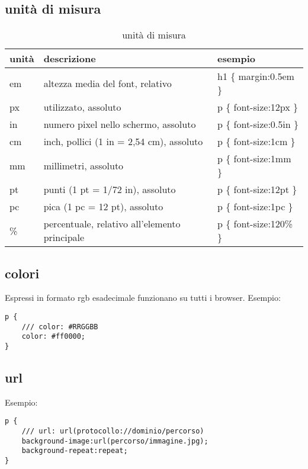 \documentclass[12pt]{article}
\begin{document}
\subsection{unità di misura}
\begin{table}[H]
	\centering
	\begin{tabular}{|l|l|l|}
		\hline
		unità & descrizione                                   & esempio                 \\
		\hline
		em    & altezza media del font, relativo              & h1 \{ margin:0.5em \}   \\
		px    & utilizzato, assoluto                          & p \{ font-size:12px \}  \\
		in    & numero pixel nello schermo, assoluto          & p \{ font-size:0.5in \} \\
		cm    & inch, pollici (1 in = 2,54 cm), assoluto      & p \{ font-size:1cm \}   \\
		mm    & millimetri, assoluto                          & p \{ font-size:1mm \}   \\
		pt    & punti (1 pt = 1/72 in), assoluto              & p \{ font-size:12pt \}  \\
		pc    & pica (1 pc = 12 pt), assoluto                 & p \{ font-size:1pc \}   \\
		\%    & percentuale, relativo all'elemento principale & p \{ font-size:120\% \} \\
		\hline
	\end{tabular}
	\caption{unità di misura}
\end{table}

\subsection{colori}
Espressi in formato rgb esadecimale funzionano su tutti i browser.
Esempio:
\begin{lstlisting}
p {
	/// color: #RRGGBB
	color: #ff0000;
}
\end{lstlisting}

\subsection{url}
Esempio:
\begin{lstlisting}
p {
	/// url: url(protocollo://dominio/percorso)
	background-image:url(percorso/immagine.jpg);
	background-repeat:repeat;
}
\end{lstlisting}
\end{document}
